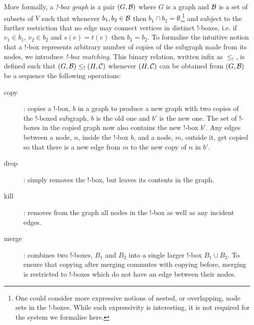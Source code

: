 \documentclass[runningheads]{llncs}
\newcommand{\inlinegraphic}[2]{
  \dimendef\grafheight=255\dimendef\grafvshift=254
  \grafheight=#1
  \grafvshift=-0.5\grafheight
  \advance\grafvshift by 0.5ex
  \raisebox{\grafvshift}{\texttt{[image: images/\#2]}\xspace}
}
\begin{document}

More formally, a \emph{!-box graph} is a pair $(G, {\cal B})$ where $G$ is a
graph and $\cal B$ is a set of subsets of $V$ such that  whenever
$b_1, b_2 \in {\cal B}$ then $b_1 \cap b_2 =\emptyset$,\footnote{One
  could consider more expressive notions of nested, or overlapping,
  node sets in the !-boxes. While such expressivity is 
  interesting,  it is not required for the system we formalise here.}  and
subject to the further restriction that no edge may connect vertices
in distinct !-boxes, i.e. if $v_1 \in b_1$, $v_2 \in b_2$ and $s(e) =
t(e)$ then $b_1 = b_2$.  
To formalise the intuitive notion that a !-box represents arbitrary
number of copies of the subgraph made from its nodes, we introduce
\emph{!-box matching}.   This binary relation, written infix as
$\leq_!$, is defined such that 
$(G,{\cal B}) \leq_! (H, {\cal C})$ whenever $(H, {\cal C})$ can be
obtained from $(G,{\cal B})$ be a sequence the following operations:

%
\begin{description}
\item[copy]: copies a !-box, $b$ in a graph to produce a new graph
  with two copies of the !-boxed subgraph, $b$ is the old one and $b'$
  is the new one. The set of !-boxes in the copied graph now also
  contains the new !-box $b'$. Any edges between a node, $n$, inside
  the !-box $b$, and a node, $m$, outside it, get copied so that there
  is a new edge from $m$ to the new copy of $n$ in $b'$. 

\item[drop]: simply removes the !-box, but leaves its contents in the
  graph.

\item[kill]: removes from the graph all nodes in the !-box as well as
  any incident edges.

\item[merge]: combines two !-boxes, $B_1$ and $B_2$ into a single
  larger !-box $B_1 \cup B_2$. To ensure that copying after merging
  commutes with copying before, merging is restricted to !-boxes which
  do not have an edge between their nodes.
\end{description}
\end{document}
